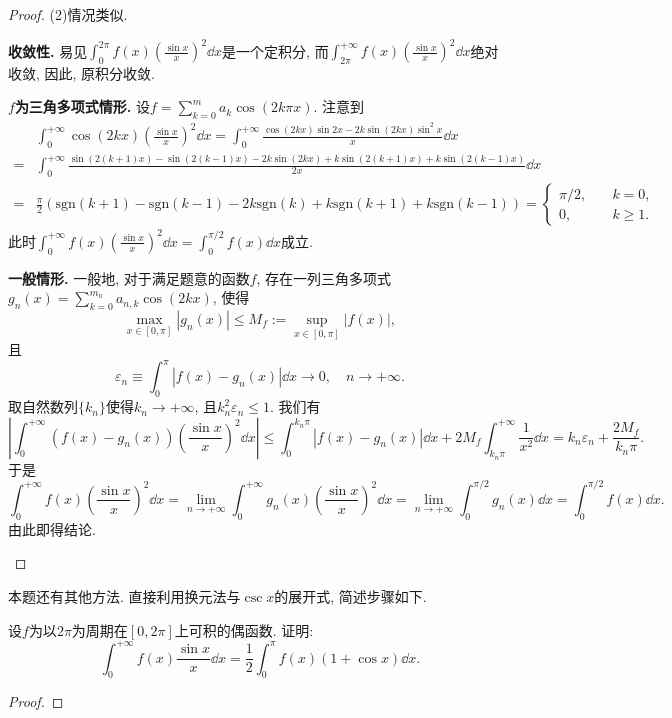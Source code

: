 \begin{quiza}
\begin{proof}
(2)情况类似.
\begin{asparaenum}[(i)]
\def\sgn{\mathrm{sgn}}
\item \textbf{收敛性. }易见\(\int_{0}^{2\pi}f(x)\left(\frac{\sin x}{x}\right)^2\dd x\)是一个定积分, 而\(\int_{2\pi}^{+\infty}f(x)\left(\frac{\sin x}{x}\right)^2\dd x\)绝对收敛, 因此, 原积分收敛.
\item \textbf{\(f\)为三角多项式情形. }设\(f=\sum_{k=0}^{m}a_k\cos(2k\pi x)\). 注意到\[\begin{split}
&\int_{0}^{+\infty}\cos(2kx)\left(\frac{\sin x}{x}\right)^2\dd x=\int_{0}^{+\infty}\frac{\cos(2kx)\sin 2x-2k\sin(2kx)\sin^2x}{x}\dd x\\
=&\int_{0}^{+\infty}\frac{\sin\left(2(k+1)x\right)-\sin(2(k-1)x)-2k\sin(2kx)+k\sin\left(2(k+1)x\right)+k\sin\left(2(k-1)x\right)}{2x}\dd x\\
=&\frac{\pi}{2}\left(\sgn(k+1)-\sgn(k-1)-2k\sgn(k)+k\sgn(k+1)+k\sgn(k-1)\right)=\begin{cases}
\pi/2,\quad &k=0,\\
0,\quad &k\geqslant 1.
\end{cases}
\end{split}\]此时\(\int_{0}^{+\infty}f(x)\left(\frac{\sin x}{x}\right)^2\dd x=\int_{0}^{\pi/2}f(x)\dd x\)成立.
\item \textbf{一般情形. }一般地, 对于满足题意的函数\(f\), 存在一列三角多项式\(g_n(x)=\sum_{k=0}^{m_n}a_{n,k}\cos(2kx)\), 使得\[\max_{x\in[0,\pi]}\left|g_n(x)\right|\leqslant M_f:=\sup_{x\in[0,\pi]}\left|f(x)\right|,\]且\[\varepsilon_n\equiv\int_{0}^{\pi}\left|f(x)-g_n(x)\right|\dd x\rightarrow 0,\quad n\rightarrow+\infty.\]取自然数列\(\{k_n\}\)使得\(k_n\rightarrow+\infty\), 且\(k_n^2\varepsilon_n\leqslant 1\). 我们有\[\left|\int_{0}^{+\infty}\left(f(x)-g_n(x)\right)\left(\frac{\sin x}{x}\right)^2\dd x\right|\leqslant\int_{0}^{k_n\pi}\left|f(x)-g_n(x)\right|\dd x+2M_f\int_{k_n\pi}^{+\infty}\frac{1}{x^2}\dd x=k_n\varepsilon_n+\frac{2M_f}{k_n\pi}.\]于是\[\int_{0}^{+\infty}f(x)\left(\frac{\sin x}{x}\right)^2\dd x=\lim_{n\rightarrow+\infty}\int_{0}^{+\infty}g_n(x)\left(\frac{\sin x}{x}\right)^2\dd x=\lim_{n\rightarrow+\infty}\int_{0}^{\pi/2}g_n(x)\dd x=\int_{0}^{\pi/2}f(x)\dd x.\]由此即得结论.\qedhere
\end{asparaenum}
\end{proof}
\tcbline
本题还有其他方法. 直接利用换元法与\(\csc x\)的展开式, 简述步骤如下.

\tcbline
\woe 设\(f\)为以\(2\pi\)为周期在\([0,2\pi]\)上可积的偶函数. 证明:\[\int_{0}^{+\infty}f(x)\frac{\sin x}{x}\dd x=\frac{1}{2}\int_{0}^{\pi}f(x)(1+\cos x)\dd x.\]
\begin{proof}


\end{proof}
\end{quiza}
